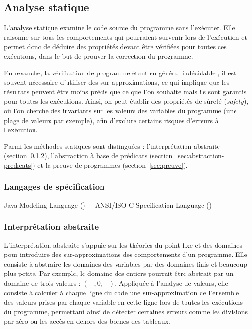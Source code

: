 

\subsection{Analyse statique}
\label{sec:AS}


L'analyse statique \cite{Nielson/99} examine le code source du programme
sans l'exécuter. Elle raisonne sur tous les comportements qui pourraient
survenir lors de l'exécution et permet donc de déduire des propriétés devant
être vérifiées pour toutes ces exécutions, dans le but de prouver la correction
du programme.

En revanche, la vérification de programme étant en général indécidable
\cite{Landi/92}, il est souvent nécessaire d'utiliser des
sur-approximations, ce qui implique que les résultats peuvent être moins précis
que ce que l'on souhaite mais ils sont garantis pour toutes les exécutions.
Ainsi, on peut établir des propriétés de sûreté ({\em safety}), où l’on cherche
des invariants sur les valeurs des variables du programme (une plage de valeurs
par exemple), afin d'exclure certains risques d'erreurs à l'exécution.

Parmi les méthodes statiques sont distinguées : l'interprétation abstraite
(section~\ref{sec:interpretation-abstraite}), l'abstraction à base de
prédicats (section~\ref{sec:abstraction-predicats}) et la preuve de programmes
(section~\ref{sec:preuve}).


\subsubsection{Langages de spécification}
\label{sec:speclang}


Java Modeling Language (\jml)
+
ANSI/ISO C Specification Language (\acsl)


\subsubsection{Interprétation abstraite}
\label{sec:interpretation-abstraite}


L'interprétation abstraite \cite{Cousot/92} s'appuie sur les
théories du point-fixe et des domaines pour introduire des sur-approximations
des comportements d'un programme. Elle consiste à abstraire les domaines des
variables par des domaines finis et beaucoup plus petits. Par exemple, le
domaine des entiers pourrait être abstrait par un domaine de trois valeurs :
$(-, 0, +)$. Appliquée à l’analyse de valeurs, elle consiste à calculer à
chaque ligne du code une sur-approximation de l’ensemble des valeurs prises par
chaque variable en cette ligne lors de toutes les exécutions du programme,
permettant ainsi de détecter certaines erreurs comme les divisions par zéro ou
les accès en dehors des bornes des tableaux.

